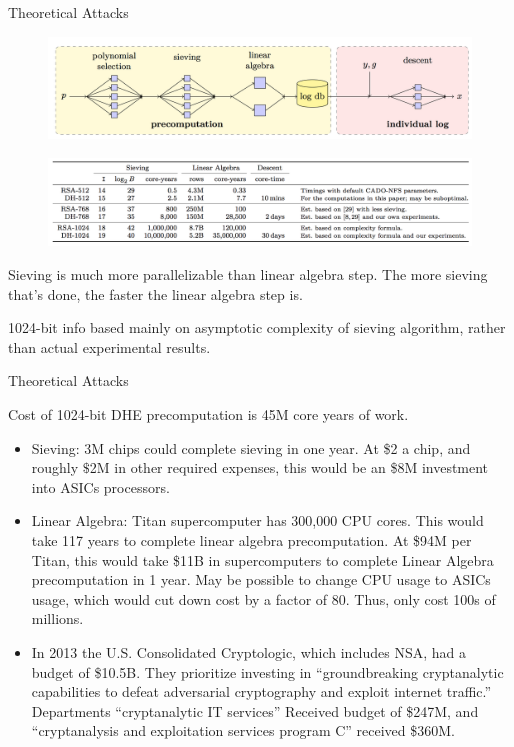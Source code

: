 \documentclass[presentation, aspectratio=54]{beamer}
\begin{document}

\begin{frame}{Theoretical Attacks}

\begin{figure}
\centering
\includegraphics[width=0.86\columnwidth]{graphics/DLOGalg.png}
\end{figure}

\begin{figure}
\centering
\includegraphics[width=0.86\columnwidth]{graphics/DLOGtable.png}
\end{figure}

Sieving is much more parallelizable than linear algebra step. The more sieving
that's done, the faster the linear algebra step is.

1024-bit info based mainly on asymptotic complexity of sieving algorithm, rather
than actual experimental results.

\end{frame}


\begin{frame}{Theoretical Attacks}

Cost of 1024-bit DHE precomputation is 45M core years of work.
\begin{itemize}
\item Sieving: 3M chips could complete sieving in one year. At \$2 a chip,
      and roughly $\$$2M in other required expenses, this would be an \$8M
      investment into ASICs processors.
\item Linear Algebra: Titan supercomputer has 300,000 CPU cores. This would
      take 117 years to complete linear algebra precomputation. At \$94M per
      Titan, this would take \$11B in supercomputers to complete Linear
      Algebra precomputation in 1 year. May be possible to change CPU usage
      to ASICs usage, which would cut down cost by a factor of 80. Thus,
      only cost 100s of millions. 
\item In 2013 the U.S. Consolidated Cryptologic, which includes NSA, had a
      budget of \$10.5B. They prioritize investing in ``groundbreaking
      cryptanalytic capabilities to defeat adversarial cryptography and exploit
      internet traffic.'' Departments ``cryptanalytic IT services'' Received
      budget of \$247M, and ``cryptanalysis and exploitation services program
      C'' received \$360M. 
\end{itemize}

\end{frame}
\end{document}
